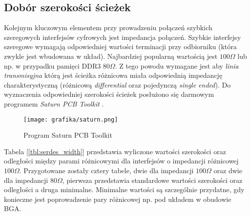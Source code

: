 \subsection{Dobór szerokości ścieżek}
Kolejnym kluczowym elementem przy prowadzeniu połączeń szybkich szeregowych interfejsów cyfrowych jest impedancja połączeń. Szybkie interfejsy szeregowe wymagają odpowiedniej wartości terminacji przy odbiorniku (która zwykle jest wbudowana w układ). Najbardziej popularną wartością jest  $100\Omega$ lub np. w przypadku pamięci DDR3 $80 \Omega$. Z tego powodu wymagane jest aby \textit{linia transmisyjna} którą jest ścieżka różnicowa miała odpowiednią impedancję charakterystyczną (różnicową \textit{differential} oraz pojedynczą \textit{single ended}). Do wyznaczenia odpowiedniej szerokości ścieżek posłużono się darmowym programem \textit{Saturn PCB Toolkit} \cite{SATURN}.  

\begin{figure}[!ht]
\centering
\texttt{[image: grafika/saturn.png]}
\caption{Program Saturn PCB Toolkit}
\end{figure}



Tabela [\ref{tbl:serdes_width}] przedstawia wyliczone wartości szerokości oraz odległości między parami różnicowymi dla interfejsów o impedancji różnicowej $100 \Omega$. Przygotowane zostały cztery tabele, dwie dla impedancji $100 \Omega$ oraz dwie dla impedancji $80 \Omega$, pierwsza przedstawia standardowe wartości szerokości oraz odległości a druga minimalne. Minimalne wartości są szczególnie przydatne, gdy konieczne jest poprowadzenie pary różnicowej np. pod układem w obudowie BGA.



